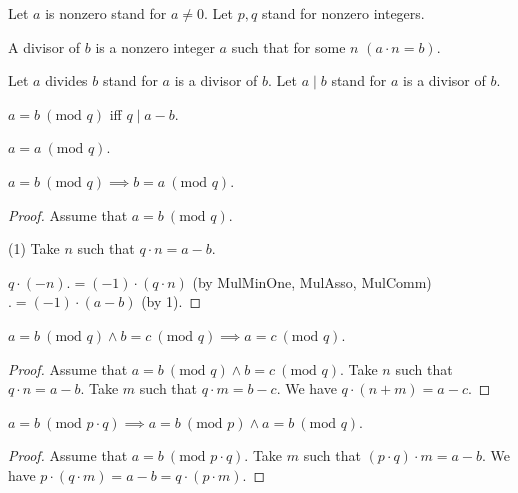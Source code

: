 \documentclass{article}
\renewcommand{\mod}{\text{mod }}
\begin{document}
  \begin{forthel}
    Let $a$ is nonzero stand for $a \neq 0$.
    Let $p,q$ stand for nonzero integers.

    \begin{definition}\label{Divisor}
      A divisor of $b$ is a nonzero integer $a$ such that for some $n$ $(a \cdot n = b)$.
    \end{definition}

    Let $a$ divides $b$ stand for $a$ is a divisor of $b$.
    Let $a \mid b$ stand for $a$ is a divisor of $b$.

    \begin{definition}\label{EquMod}
      $a = b ~(\mod q)$ iff $q \mid a-b$.
    \end{definition}

    \begin{lemma}\label{EquModRef}
      $a = a ~(\mod q)$.
    \end{lemma}

    \begin{lemma}\label{EquModSym}
      $a = b ~(\mod q) \implies b = a ~(\mod q)$.
    \end{lemma}
    \begin{proof}
      Assume that $a = b ~(\mod q)$.

      (1) Take $n$ such that $q \cdot n = a - b$.

      $q \cdot (-n) .= (-1) \cdot (q \cdot n)$ (by MulMinOne, MulAsso, MulComm) $.= (-1) \cdot (a - b)$ (by 1).
    \end{proof}

    \begin{lemma}\label{EquModTrn}
      $a = b ~(\mod q) \wedge b = c ~(\mod q) \implies a = c ~(\mod q)$.
    \end{lemma}
    \begin{proof}
      Assume that $a = b ~(\mod q) \wedge b = c ~(\mod q)$.
      Take $n$ such that $q \cdot n = a - b$.
      Take $m$ such that $q \cdot m = b - c$.
      We have $q \cdot (n + m) = a - c$.
    \end{proof}

    \begin{lemma}\label{EquModMul}
      $a = b ~(\mod p \cdot q) \implies a = b ~(\mod p) \wedge a = b ~(\mod q)$.
    \end{lemma}
    \begin{proof}
      Assume that $a = b ~(\mod p \cdot q)$.
      Take $m$ such that $(p \cdot q) \cdot m = a - b$.
      We have $p \cdot (q \cdot m) = a - b = q \cdot (p \cdot m)$.
    \end{proof}
  \end{forthel}
\end{document}
